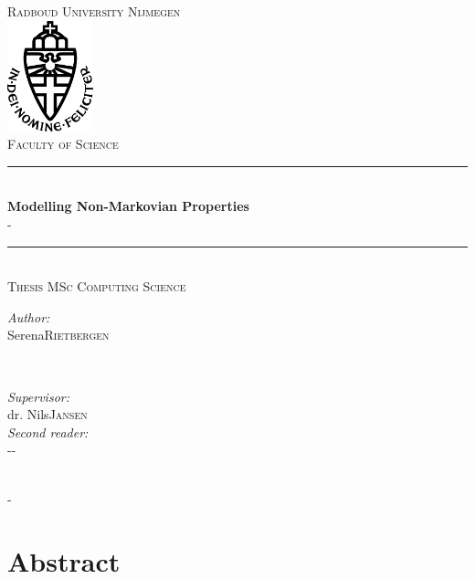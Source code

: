 \documentclass[12pt,twoside]{report}
\title{\thesistitle}
\author{\thesisauthorfirst\space\thesisauthorsecond}
\date{\thesisdate}
\def\thesistitle{Modelling Non-Markovian Properties}
\def\thesissubtitle{-}
\def\thesisauthorfirst{Serena}
\def\thesisauthorsecond{Rietbergen}
\def\thesissupervisorfirst{dr. Nils}
\def\thesissupervisorsecond{Jansen}
\def\thesissecondreaderfirst{-}
\def\thesissecondreadersecond{-}
\def\thesisdate{-}
\theoremstyle{definition}
\theoremstyle{remark}
\begin{document}
	\begin{titlepage}
		\thispagestyle{empty}
		\newcommand{\HRule}{\rule{\linewidth}{0.5mm}}
		\center
		\textsc{\Large Radboud University Nijmegen}\\[.7cm]
		\includegraphics[width=25mm]{img/in_dei_nomine_feliciter.eps}\\[.5cm]
		\textsc{Faculty of Science}\\[0.5cm]
		
		\HRule \\[0.4cm]
		{ \huge \bfseries \thesistitle}\\[0.1cm]
		\textsc{\thesissubtitle}\\
		\HRule \\[.5cm]
		\textsc{\large Thesis MSc Computing Science}\\[.5cm]
		
		\begin{minipage}{0.4\textwidth}
			\begin{flushleft} \large
				\emph{Author:}\\
				\thesisauthorfirst\space \textsc{\thesisauthorsecond}
			\end{flushleft}
		\end{minipage}
		~
		\begin{minipage}{0.4\textwidth}
			\begin{flushright} \large
				\emph{Supervisor:} \\
				\thesissupervisorfirst\space \textsc{\thesissupervisorsecond} \\[1em]
				\emph{Second reader:} \\
				\thesissecondreaderfirst\space \textsc{\thesissecondreadersecond}
			\end{flushright}
		\end{minipage}\\[4cm]
		\vfill
		{\large \thesisdate}\\
		\clearpage
	\end{titlepage}
	
	\tableofcontents
	
	\newpage
	
	\chapter*{Abstract}
	
	
\end{document}
